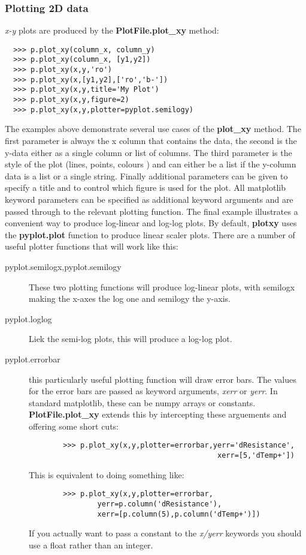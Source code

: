 \documentclass[a4paper,11pt]{scrartcl}
\begin{document}
\subsubsection{Plotting 2D data}

\textit{x-y} plots are produced by the \textbf{PlotFile.plot\_xy} method:

\begin{verbatim}
  >>> p.plot_xy(column_x, column_y)
  >>> p.plot_xy(column_x, [y1,y2])
  >>> p.plot_xy(x,y,'ro')
  >>> p.plot_xy(x,[y1,y2],['ro','b-'])
  >>> p.plot_xy(x,y,title='My Plot')
  >>> p.plot_xy(x,y,figure=2)
  >>> p.plot_xy(x,y,plotter=pyplot.semilogy)
\end{verbatim}

The examples above demonstrate several use cases of the \textbf{plot\_xy} method. The first parameter is always the x column that contains the data, the second is the y-data either as a single column or list of columns. The third parameter is the style of the plot (lines, points, colours \etc) and can either be a list if the y-column data is a list or a single string. Finally additional parameters can be given to specify a title and to control which figure is used for the plot. All matplotlib keyword parameters can be specified as additional keyword arguments and are passed through to the relevant plotting function. The final example illustrates a convenient way to produce log-linear and log-log plots. By default, \textbf{plotxy} uses the \textbf{pyplot.plot} function to produce linear scaler plots. There are a number of useful plotter functions that will work like this:
\begin{description}
  \item[pyplot.semilogx,pyplot.semilogy] These two plotting functions will produce log-linear plots, with semilogx making the x-axes the log one and semilogy the y-axis.
  \item[pyplot.loglog] Liek the semi-log plots, this will produce a log-log plot.
  \item[pyplot.errorbar] this particularly useful plotting function will draw error bars. The values for the error bars are passed as keyword arguments, \textit{xerr} or \textit{yerr}. In standard matplotlib, these can be numpy arrays or constants. \textbf{PlotFile.plot\_xy} extends this by intercepting these arguements and offering some short cuts:
      \begin{verbatim}
        >>> p.plot_xy(x,y,plotter=errorbar,yerr='dResistance',
                                            xerr=[5,'dTemp+'])
      \end{verbatim}
      This is equivalent to doing something like:
       \begin{verbatim}
        >>> p.plot_xy(x,y,plotter=errorbar,
                yerr=p.column('dResistance'),
                xerr=[p.column(5),p.column('dTemp+')])
      \end{verbatim}
    If you actually want to pass a constant to the \textit{x/yerr} keywords you should use a float rather than an integer.
\end{description}
\end{document}
